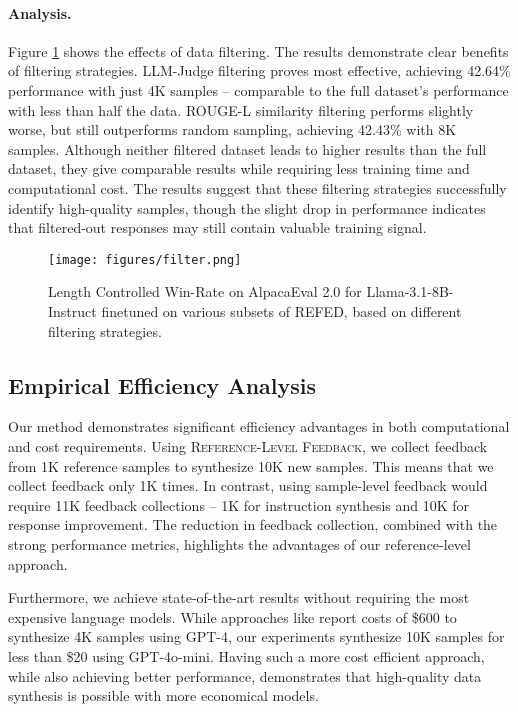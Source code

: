 \paragraph{Analysis.} 
Figure \ref{fig:filtering} shows the effects of data filtering. The results demonstrate clear benefits of filtering strategies. LLM-Judge filtering proves most effective, achieving 42.64\% performance with just 4K samples -- comparable to the full dataset's performance with less than half the data. ROUGE-L similarity filtering performs slightly worse, but still outperforms random sampling, achieving 42.43\% with 8K samples. Although neither filtered dataset leads to higher results than the full dataset, they give comparable results while requiring less training time and computational cost. The results suggest that these filtering strategies successfully identify high-quality samples, though the slight drop in performance indicates that filtered-out responses may still contain valuable training signal.


\begin{figure}[t]
    \centering
    \texttt{[image: figures/filter.png]} \hfill

    \caption{Length Controlled Win-Rate on AlpacaEval 2.0 for Llama-3.1-8B-Instruct finetuned on various subsets of \textsc{REFED}, based on different filtering strategies.
    }
    \label{fig:filtering}
\end{figure}

\subsection{Empirical Efficiency Analysis}
Our method demonstrates significant efficiency advantages in both computational and cost requirements. Using \textsc{Reference-Level Feedback}, we collect feedback from 1K reference samples to synthesize 10K new samples. This means that we collect feedback only 1K times. In contrast, using sample-level feedback would require 11K feedback collections -- 1K for instruction synthesis and 10K for response improvement. The reduction in feedback collection, combined with the strong performance metrics, highlights the advantages of our reference-level approach.

Furthermore, we achieve state-of-the-art results without requiring the most expensive language models. While approaches like \citet{kaur2024instruct} report costs of \$600 to synthesize 4K samples using GPT-4, our experiments synthesize 10K samples for less than \$20 using GPT-4o-mini. Having such a more cost efficient approach, while also achieving better performance, demonstrates that high-quality data synthesis is possible with more economical models.
